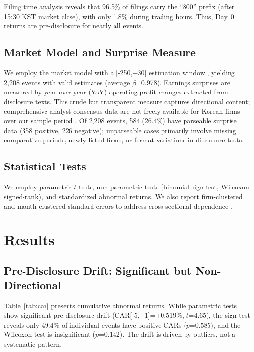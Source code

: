 \documentclass[manuscript,review,anonymous]{acmart}
\begin{document}
Filing time analysis reveals that 96.5\% of filings carry the ``800'' prefix (after 15:30 KST market close), with only 1.8\% during trading hours. Thus, Day~0 returns are pre-disclosure for nearly all events.

\subsection{Market Model and Surprise Measure}

We employ the market model with a [-250,$-$30] estimation window \cite{mackinlay1997event}, yielding 2,208 events with valid estimates (average $\beta$=0.978). Earnings surprises are measured by year-over-year (YoY) operating profit changes extracted from disclosure texts. This crude but transparent measure captures directional content; comprehensive analyst consensus data are not freely available for Korean firms over our sample period \cite{livnat2006comparing}. Of 2,208 events, 584 (26.4\%) have parseable surprise data (358 positive, 226 negative); unparseable cases primarily involve missing comparative periods, newly listed firms, or format variations in disclosure texts.

\subsection{Statistical Tests}

We employ parametric $t$-tests, non-parametric tests (binomial sign test, Wilcoxon signed-rank), and standardized abnormal returns. We also report firm-clustered and month-clustered standard errors to address cross-sectional dependence \cite{kolari2010event}.

\section{Results}

\subsection{Pre-Disclosure Drift: Significant but Non-Directional}

Table~\ref{tab:car} presents cumulative abnormal returns. While parametric tests show significant pre-disclosure drift (CAR[-5,$-$1]=+0.519\%, $t$=4.65), the sign test reveals only 49.4\% of individual events have positive CARs ($p$=0.585), and the Wilcoxon test is insignificant ($p$=0.142). The drift is driven by outliers, not a systematic pattern.
\end{document}

